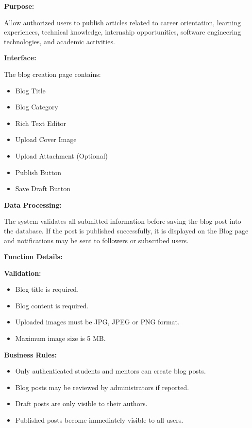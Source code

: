 \vspace{0.2cm}

\textbf{Purpose:}

Allow authorized users to publish articles related to career orientation, learning experiences, technical knowledge, internship opportunities, software engineering technologies, and academic activities.

\vspace{0.2cm}

\textbf{Interface:}

The blog creation page contains:

\begin{itemize}
    \item Blog Title
    \item Blog Category
    \item Rich Text Editor
    \item Upload Cover Image
    \item Upload Attachment (Optional)
    \item Publish Button
    \item Save Draft Button
\end{itemize}

\vspace{0.2cm}

\textbf{Data Processing:}

The system validates all submitted information before saving the blog post into the database. If the post is published successfully, it is displayed on the Blog page and notifications may be sent to followers or subscribed users.

\vspace{0.3cm}

\textbf{Function Details:}

\textbf{Validation:}

\begin{itemize}
    \item Blog title is required.
    \item Blog content is required.
    \item Uploaded images must be JPG, JPEG or PNG format.
    \item Maximum image size is 5 MB.
\end{itemize}

\vspace{0.2cm}

\textbf{Business Rules:}

\begin{itemize}
    \item Only authenticated students and mentors can create blog posts.
    \item Blog posts may be reviewed by administrators if reported.
    \item Draft posts are only visible to their authors.
    \item Published posts become immediately visible to all users.
\end{itemize}

